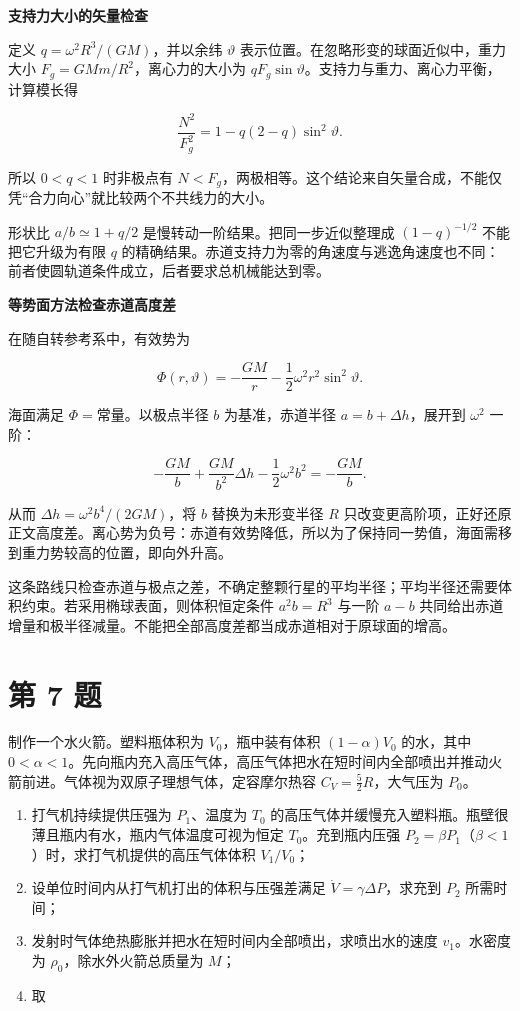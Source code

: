 \documentclass[12pt,a4paper,UTF8]{ctexart}
\newcommand{\tightlist}{\setlength{\itemsep}{0pt}\setlength{\parskip}{0pt}}
\begin{document}
\textbf{支持力大小的矢量检查}

定义 \(q=\omega^2R^3/(GM)\)，并以余纬 \(\vartheta\)
表示位置。在忽略形变的球面近似中，重力大小
\(F_g=GMm/R^2\)，离心力的大小为
\(qF_g\sin\vartheta\)。支持力与重力、离心力平衡，计算模长得

\[\frac{N^2}{F_g^2}=1-q(2-q)\sin^2\vartheta.\]

所以 \(0<q<1\) 时非极点有
\(N<F_g\)，两极相等。这个结论来自矢量合成，不能仅凭``合力向心''就比较两个不共线力的大小。

形状比 \(a/b\simeq1+q/2\) 是慢转动一阶结果。把同一步近似整理成
\((1-q)^{-1/2}\) 不能把它升级为有限 \(q\)
的精确结果。赤道支持力为零的角速度与逃逸角速度也不同：前者使圆轨道条件成立，后者要求总机械能达到零。

\textbf{等势面方法检查赤道高度差}

在随自转参考系中，有效势为

\[\Phi(r,\vartheta)=-\frac{GM}{r}-\frac12\omega^2r^2\sin^2\vartheta.\]

海面满足 \(\Phi=\text{常量}\)。以极点半径 \(b\) 为基准，赤道半径
\(a=b+\Delta h\)，展开到 \(\omega^2\) 一阶：

\[-\frac{GM}{b}+\frac{GM}{b^2}\Delta h-\frac12\omega^2b^2=-\frac{GM}{b}.\]

从而 \(\Delta h=\omega^2b^4/(2GM)\)，将 \(b\) 替换为未形变半径 \(R\)
只改变更高阶项，正好还原正文高度差。离心势为负号：赤道有效势降低，所以为了保持同一势值，海面需移到重力势较高的位置，即向外升高。

这条路线只检查赤道与极点之差，不确定整颗行星的平均半径；平均半径还需要体积约束。若采用椭球表面，则体积恒定条件
\(a^2b=R^3\) 与一阶 \(a-b\)
共同给出赤道增量和极半径减量。不能把全部高度差都当成赤道相对于原球面的增高。

\newpage

\section{第 7 题}\label{ux7b2c-7-ux9898}

制作一个水火箭。塑料瓶体积为 \(V_0\)，瓶中装有体积 \((1-\alpha)V_0\)
的水，其中
\(0<\alpha<1\)。先向瓶内充入高压气体，高压气体把水在短时间内全部喷出并推动火箭前进。气体视为双原子理想气体，定容摩尔热容
\(C_V=\frac52R\)，大气压为 \(P_0\)。

\begin{enumerate}
\def\labelenumi{\arabic{enumi}.}
\tightlist
\item
  打气机持续提供压强为 \(P_1\)、温度为 \(T_0\)
  的高压气体并缓慢充入塑料瓶。瓶壁很薄且瓶内有水，瓶内气体温度可视为恒定
  \(T_0\)。充到瓶内压强
  \(P_2=\beta P_1\)（\(\beta<1\)）时，求打气机提供的高压气体体积
  \(V_1/V_0\)；
\item
  设单位时间内从打气机打出的体积与压强差满足
  \(\dot V=\gamma\Delta P\)，求充到 \(P_2\) 所需时间；
\item
  发射时气体绝热膨胀并把水在短时间内全部喷出，求喷出水的速度
  \(v_1\)。水密度为 \(\rho_0\)，除水外火箭总质量为 \(M\)；
\item
  取
\end{enumerate}
\end{document}
